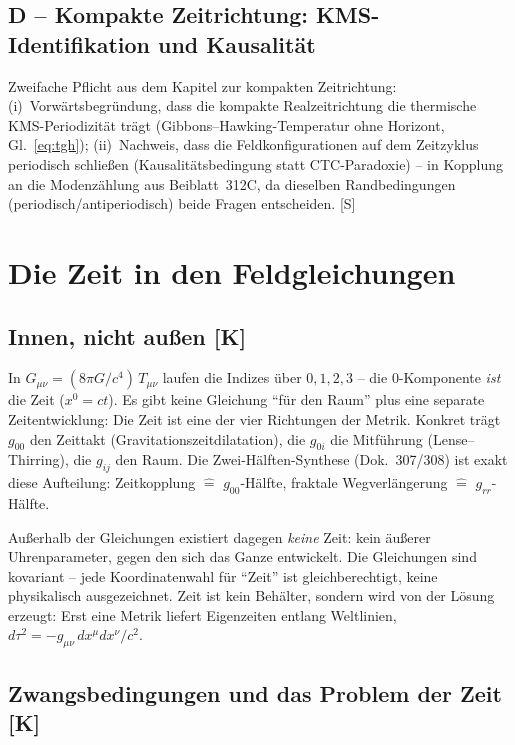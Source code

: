\documentclass[11pt]{report}
\begin{document}
\section{D -- Kompakte Zeitrichtung: KMS-Identifikation und
Kausalität}

Zweifache Pflicht aus dem Kapitel zur kompakten Zeitrichtung:
(i)~Vorwärtsbegründung, dass die kompakte Realzeitrichtung die
thermische KMS-Periodizität trägt (Gibbons--Hawking-Temperatur ohne
Horizont, Gl.~\eqref{eq:tgh}); (ii)~Nachweis, dass die
Feldkonfigurationen auf dem Zeitzyklus periodisch schließen
(Kausalitätsbedingung statt CTC-Paradoxie) -- in Kopplung an die
Modenzählung aus Beiblatt~312C, da dieselben Randbedingungen
(periodisch/antiperiodisch) beide Fragen entscheiden. [S]

\chapter{Die Zeit in den Feldgleichungen}

\section{Innen, nicht außen [K]}

In $G_{\mu\nu} = (8\pi G/c^4)\,T_{\mu\nu}$ laufen die Indizes über
$0,1,2,3$ -- die $0$-Komponente \emph{ist} die Zeit ($x^0 = ct$).
Es gibt keine Gleichung \enquote{für den Raum} plus eine separate
Zeitentwicklung: Die Zeit ist eine der vier Richtungen der Metrik.
Konkret trägt $g_{00}$ den Zeittakt (Gravitationszeitdilatation),
die $g_{0i}$ die Mitführung (Lense--Thirring), die $g_{ij}$ den
Raum. Die Zwei-Hälften-Synthese (Dok.~307/308) ist exakt diese
Aufteilung: Zeitkopplung $\hat{=}$ $g_{00}$-Hälfte, fraktale
Wegverlängerung $\hat{=}$ $g_{rr}$-Hälfte.

Außerhalb der Gleichungen existiert dagegen \emph{keine} Zeit: kein
äußerer Uhrenparameter, gegen den sich das Ganze entwickelt. Die
Gleichungen sind kovariant -- jede Koordinatenwahl für
\enquote{Zeit} ist gleichberechtigt, keine physikalisch
ausgezeichnet. Zeit ist kein Behälter, sondern wird von der Lösung
erzeugt: Erst eine Metrik liefert Eigenzeiten entlang Weltlinien,
$d\tau^2 = -g_{\mu\nu}\,dx^\mu dx^\nu/c^2$.

\section{Zwangsbedingungen und das Problem der Zeit [K]}
\end{document}
